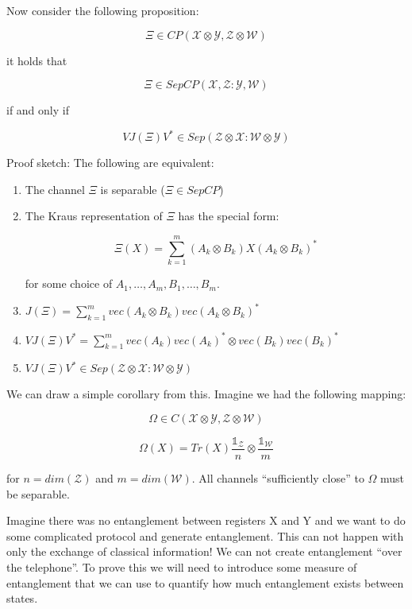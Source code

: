 \documentclass{article}
\begin{document}
Now consider the following proposition:

\[ 
        \Xi \in CP(\mathcal{X}\otimes \mathcal{Y}, \mathcal{Z}\otimes
        \mathcal{W})
\]

it holds that 

\[ 
        \Xi \in SepCP(\mathcal{X},\mathcal{Z}:\mathcal{Y},\mathcal{W}) 
\]

if and only if

\[
        V J(\Xi) V^* \in Sep(\mathcal{Z}\otimes \mathcal{X}: \mathcal{W}\otimes
\mathcal{Y})
\]

Proof sketch: The following are equivalent:

\begin{enumerate}
    \item The channel $\Xi$ is  separable ($\Xi \in SepCP$)
    \item The Kraus representation of $\Xi$ has the special form:

        \[ 
                \Xi(X) = \sum_{k=1}^m \left( A_k \otimes B_k \right) X \left(
                A_k \otimes B_k \right)^* 
        \]
        
        for some choice of $A_1,\ldots,A_m, B_1,\ldots, B_m$.

    \item $J(\Xi) = \sum_{k=1}^m vec(A_k \otimes B_k)vec(A_k \otimes B_k)^*$
    \item $V J(\Xi) V^* = \sum_{k=1}^m vec(A_k)vec(A_k)^* \otimes
        vec(B_k)vec(B_k)^*$
    \item $V J(\Xi) V^* \in Sep(\mathcal{Z}\otimes \mathcal{X}:
        \mathcal{W}\otimes \mathcal{Y})$
\end{enumerate}

We can draw a simple corollary from this. Imagine we had the following mapping:

\[ 
        \Omega \in C(\mathcal{X}\otimes \mathcal{Y}, \mathcal{Z} \otimes
        \mathcal{W})
\]

\[ 
        \Omega(X) = Tr(X) \frac{\mathds{1}_{\mathcal{Z}}}{n} \otimes
            \frac{\mathds{1}_{\mathcal{W}}}{m}
\]

for $n = dim(\mathcal{Z})$ and $m=dim(\mathcal{W})$. All channels ``sufficiently
close'' to $\Omega$ must be separable.

Imagine there was no entanglement between registers X and Y and we want to do
some complicated protocol and generate entanglement. This can not happen with
only the exchange of classical information! We can not create entanglement
``over the telephone''. To prove this we will need to introduce some measure of
entanglement that we can use to quantify how much entanglement exists between
states.
\end{document}
